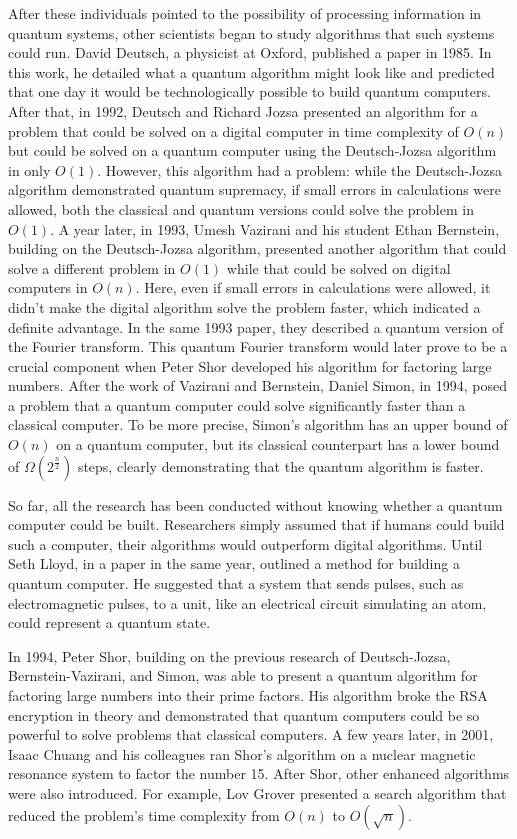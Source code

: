 \documentclass[conference]{IEEEtran}
\begin{document}
After these individuals pointed to the possibility of processing information in quantum systems, other scientists began to study algorithms that such systems could run. David Deutsch, a physicist at Oxford, published a paper in 1985. In this work, he detailed what a quantum algorithm might look like and predicted that one day it would be technologically possible to build quantum computers. After that, in 1992, Deutsch and Richard Jozsa presented an algorithm for a problem that could be solved on a digital computer in time complexity of $O(n)$ but could be solved on a quantum computer using the Deutsch-Jozsa algorithm in only $O(1)$. However, this algorithm had a problem: while the Deutsch-Jozsa algorithm demonstrated quantum supremacy, if small errors in calculations were allowed, both the classical and quantum versions could solve the problem in $O(1)$. A year later, in 1993, Umesh Vazirani and his student Ethan Bernstein, building on the Deutsch-Jozsa algorithm, presented another algorithm that could solve a different problem in $O(1)$ while that could be solved on digital computers in $O(n)$. Here, even if small errors in calculations were allowed, it didn't make the digital algorithm solve the problem faster, which indicated a definite advantage. In the same 1993 paper, they described a quantum version of the Fourier transform. This quantum Fourier transform would later prove to be a crucial component when Peter Shor developed his algorithm for factoring large numbers. After the work of Vazirani and Bernstein, Daniel Simon, in 1994, posed a problem that a quantum computer could solve significantly faster than a classical computer. To be more precise, Simon's algorithm has an upper bound of $O(n)$ on a quantum computer, but its classical counterpart has a lower bound of $\Omega(2^{\frac{n}{2}})$ steps, clearly demonstrating that the quantum algorithm is faster.

So far, all the research has been conducted without knowing whether a quantum computer could be built. Researchers simply assumed that if humans could build such a computer, their algorithms would outperform digital algorithms. Until Seth Lloyd, in a paper in the same year, outlined a method for building a quantum computer. He suggested that a system that sends pulses, such as electromagnetic pulses, to a unit, like an electrical circuit simulating an atom, could represent a quantum state.

In 1994, Peter Shor, building on the previous research of Deutsch-Jozsa, Bernstein-Vazirani, and Simon, was able to present a quantum algorithm for factoring large numbers into their prime factors. His algorithm broke the RSA encryption in theory and demonstrated that quantum computers could be so powerful to solve problems that classical computers. A few years later, in 2001, Isaac Chuang and his colleagues ran Shor's algorithm on a nuclear magnetic resonance system to factor the number 15. After Shor, other enhanced algorithms were also introduced. For example, Lov Grover presented a search algorithm that reduced the problem's time complexity from $O(n)$ to $O(\sqrt{n})$.
\end{document}
